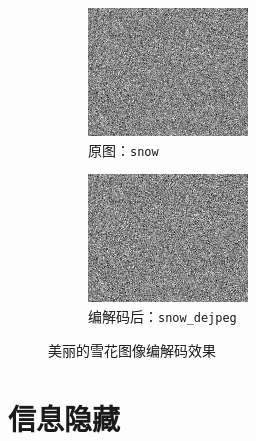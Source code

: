 \documentclass{article}
\numberwithin{figure}{section}
\numberwithin{table}{section}
\numberwithin{listing}{section}
\numberwithin{equation}{section}
\begin{document}
\begin{enumerate}
                \begin{figure}[H]
                    \centering
                    \begin{subfigure}{0.5\textwidth}
                        \centering
                        \includegraphics[width=0.6\linewidth]{snow}
                        \caption{原图：\texttt{snow}}
                    \end{subfigure}%
                    \begin{subfigure}{0.5\textwidth}
                        \centering
                        \includegraphics[width=0.6\linewidth]{snow_dejpeg}
                        \caption{编解码后：\texttt{snow\_dejpeg}}
                    \end{subfigure}
                    \caption{美丽的雪花图像编解码效果}
                \end{figure}

        \end{enumerate}
    

    \newpage
    \section{信息隐藏} %
    \label{sec:信息隐藏}
    
\end{document}
